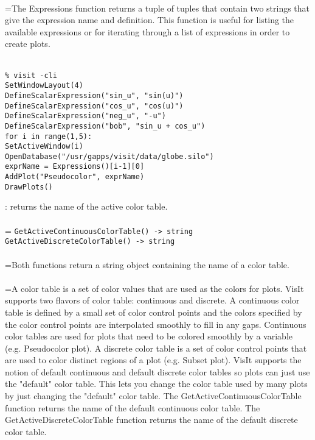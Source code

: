 \documentclass[10pt,a4paper]{report}
\begin{document}
 \\ 
\hangindent=\parindent The Expressions function returns a tuple of tuples that contain two strings that give the expression name and definition. This function is useful for listing the available expressions or for iterating through a list of expressions in order to create plots. \\[-3mm] 

\\[-6mm]
\begin{verbatim}% visit -cli
SetWindowLayout(4)
DefineScalarExpression("sin_u", "sin(u)")
DefineScalarExpression("cos_u", "cos(u)")
DefineScalarExpression("neg_u", "-u")
DefineScalarExpression("bob", "sin_u + cos_u")
for i in range(1,5):
SetActiveWindow(i)
OpenDatabase("/usr/gapps/visit/data/globe.silo")
exprName = Expressions()[i-1][0]
AddPlot("Pseudocolor", exprName)
DrawPlots()
\end{verbatim}
\newpage


{}
: returns the name of the active color table.\\[-3mm]

 \\ 
\hangindent=\parindent 
\verb!GetActiveContinuousColorTable() -> string!\\ 
\verb!GetActiveDiscreteColorTable() -> string!\\ [-3mm]

 \\ 
\hangindent=\parindent Both functions return a string object containing the name of a color table. \\[-3mm] 

 \\ 
\hangindent=\parindent A color table is a set of color values that are used as the colors for plots. VisIt supports two flavors of color table: continuous and discrete. A continuous color table is defined by a small set of color control points and the colors specified by the color control points are interpolated smoothly to fill in any gaps. Continuous color tables are used for plots that need to be colored smoothly by a variable (e.g. Pseudocolor plot). A discrete color table is a set of color control points that are used to color distinct regions of a plot (e.g. Subset plot). VisIt supports the notion of default continuous and default discrete color tables so plots can just use the "default" color table. This lets you change the color table used by many plots by just changing the "default" color table. The GetActiveContinuousColorTable function returns the name of the default continuous color table. The GetActiveDiscreteColorTable function returns the name of the default discrete color table. \\[-3mm] 
\end{document}

